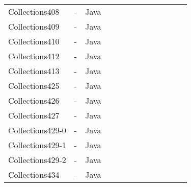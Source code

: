 \begin{table}[h!]
\begin{tabular}{lcccccccccccc}
    Collections408    &  -  & Java  &  &              &    &                                 &                   &                           &                                \\
    Collections409    &  -  & Java  &  &              &    &                                 &                   &                           &                                \\
    Collections410    &  - & Java  &  &              &    &                                 &                   &                           &                                \\
    Collections412    &  -  & Java  &  &              &    &                                 &                   &                           &                                \\
    Collections413    &  -  & Java  &  &              &    &                                 &                   &                           &                                \\
    Collections425    &  -  & Java  &  &              &    &                                 &                   &                           &                                \\
    Collections426    &  -  & Java  &  &              &    &                                 &                   &                           &                                \\
    Collections427    &   - & Java  &  &              &    &                                 &                   &                           &                                \\
    Collections429-0    &  -  & Java  &  &              &    &                                 &                   &                           &                                \\
    Collections429-1    &  -  & Java  &  &              &    &                                 &                   &                           &                                \\
    Collections429-2    &  -  & Java  &  &              &    &                                 &                   &                           &                                \\
    Collections434    & -   & Java  &  &              &    &                                 &                   &                           &                                \\

\end{tabular}
\end{table}
